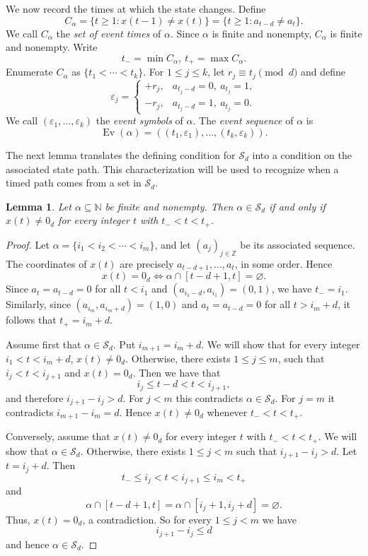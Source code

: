 \documentclass[11pt]{amsart}
\newtheorem{lemma}[theorem]{Lemma}
\theoremstyle{definition}
\theoremstyle{remark}
\newcommand{\N}{\mathbb N}
\newcommand{\Z}{\mathbb Z}
\newcommand{\Sd}{\mathcal S_d}
\begin{document}
We now record the times at which the state changes. Define
$$
C_\alpha=\{t\geq1:x(t-1)\neq x(t)\}
       =\{t\geq1:a_{t-d}\neq a_t\}.
$$
We call $C_\alpha$ the \emph{set of event times} of $\alpha$. Since $\alpha$ is finite and nonempty, $C_\alpha$ is finite and nonempty.
Write
\[
 t_-=\min C_\alpha, \  t_+=\max C_\alpha.
\]
Enumerate $C_\alpha$ as $\{t_1<\cdots<t_k\}$.  For $1\leq j\leq k$, let
$r_j\equiv t_j\pmod d$ and define
\[
 \varepsilon_j=
 \begin{cases}
  +r_j,&a_{t_j-d}=0,\ a_{t_j}=1,\\
  -r_j,&a_{t_j-d}=1,\ a_{t_j}=0.
 \end{cases}
\]
We call $(\varepsilon_1,\ldots,\varepsilon_k)$ the \emph{event symbols} of
$\alpha$.  The \emph{event sequence} of $\alpha$ is
\[
  \operatorname{Ev}(\alpha)
 =((t_1,\varepsilon_1),\ldots,(t_k,\varepsilon_k)).  
\]

The next lemma translates the defining condition for $\Sd$ into a condition on the associated state path. This characterization will be used to recognize when a timed path comes from a set in $\Sd$.


\begin{lemma}\label{lem:punctured}
Let $\alpha\subseteq\N$ be finite and nonempty.  Then $\alpha\in\Sd$ if and
only if $x(t)\neq0_d$ for every integer $t$ with $t_-<t<t_+$.
\end{lemma}

\begin{proof}
Let $\alpha=\{i_1<i_2<\cdots<i_m\}$, and let $(a_j)_{j\in \Z}$ be its associated sequence.
The coordinates of $x(t)$ are precisely
$a_{t-d+1},\ldots,a_t$, in some order.  Hence
\[
 x(t)=0_d  \Longleftrightarrow   \alpha\cap[t-d+1,t]= \varnothing.   
\]
Since $a_t = a_{t-d} = 0$ for all $t < i_1$ and
$(a_{i_1-d},a_{i_1})=(0,1)$, we have $t_-=i_1$.
Similarly, since $(a_{i_m},a_{i_m+d})=(1,0)$ and
$a_t=a_{t-d}=0$ for all $t>i_m+d$, it follows that $t_+=i_m+d$.
 

Assume first that $\alpha\in\Sd$.  Put $i_{m+1}=i_m+d$. 
We will show that for every integer $i_1<t<i_m+d$, $x(t)\neq 0_d$.
Otherwise, there exists $1\le j \le m$, such that $i_j<t<i_{j+1}$ and $x(t)=0_d$.
Then we have that
\[
 i_j\leq t-d<t<i_{j+1},
\]
and therefore $i_{j+1}-i_j>d.$
For $j<m$ this contradicts $\alpha\in\Sd$.  For $j=m$ it contradicts $i_{m+1}-i_m=d.$
Hence $x(t)\neq0_d$ whenever $t_-<t<t_+$.

Conversely, assume that $x(t)\neq0_d$ for every integer $t$ with
$t_-<t<t_+$. We will show that $\alpha \in \Sd$. Otherwise, there exists $1\le j<m$ such that $i_{j+1}-i_j>d$.
Let $t=i_j+d.$
Then
\[
 t_-\le i_j<t<i_{j+1}\leq i_m<t_+
\]
and
\[
 \alpha\cap[t-d+1,t]=\alpha\cap[i_j+1,i_j+d]=\varnothing.
\]
Thus, $x(t)=0_d$, a contradiction.  So for every $1\le j<m$ we have
\[
 i_{j+1}-i_j\leq d
\]
and hence $\alpha\in\Sd$.
\end{proof}
\end{document}
